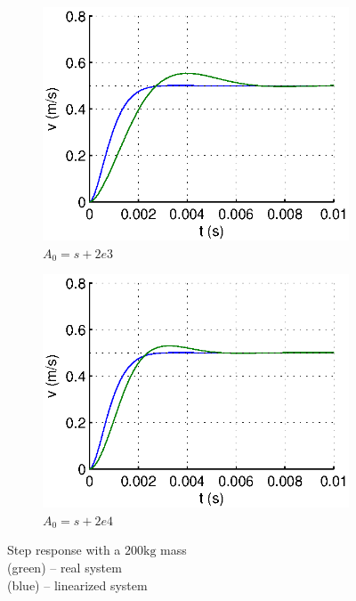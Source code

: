\begin{figure}[hb]
  \centering
  \begin{subfigure}[b]{\linewidth}
   \includegraphics[width=\columnwidth]{fig/step_m_w0eqwm.eps}
   \caption{$A_0 = s+2e3$}
  \end{subfigure}
  \begin{subfigure}[b]{\linewidth}
  \includegraphics[width=\columnwidth]{fig/step_m_w0eq10wm.eps}
   \caption{$A_0 = s + 2e4$}
  \end{subfigure}
 \caption{Step response with a $200\text{kg}$ mass \\ (green) -- real system \\ (blue) -- linearized system}
 \label{mass}
\end{figure}

